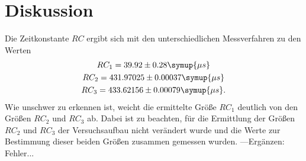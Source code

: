 \section{Diskussion}
\label{sec:Diskussion}
Die Zeitkonstante $RC$ ergibt sich mit den unterschiedlichen Messverfahren zu den Werten
\begin{gather}
    RC_{1} = 39.92\pm0.28\symup{\mu s} \notag \\
    RC_{2} = 431.97025\pm0.00037\symup{\mu s} \notag \\
    RC_{3} = 433.62156\pm0.00079\symup{\mu s} \notag .
\end{gather}
Wie unschwer zu erkennen ist, weicht die ermittelte Größe $RC_{1}$ deutlich von den Größen
$RC_{2}$ und $RC_{3}$ ab. Dabei ist zu beachten, für die Ermittlung der Größen $RC_{2}$ und $RC_{3}$
der Versuchsaufbau nicht verändert wurde und die Werte zur Bestimmung dieser beiden Größen zusammen gemessen wurden.
---Ergänzen: Fehler... 
